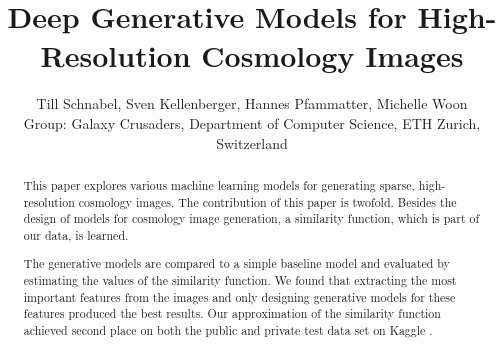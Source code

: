 \documentclass[10pt,conference,compsocconf]{IEEEtran}
\newcommand\TODO[1]{\textcolor{red}{#1}} %
\begin{document}
\title{Deep Generative Models for High-Resolution Cosmology Images}

\author{Till Schnabel, Sven Kellenberger, Hannes Pfammatter, Michelle Woon \\Group: Galaxy Crusaders, Department of Computer Science, ETH Zurich, Switzerland}

\maketitle

\begin{abstract}
This paper explores various machine learning models for generating sparse, high-resolution cosmology images. %
The contribution of this paper is twofold. Besides the design of models for cosmology image generation, a similarity function, which is part of our data, is learned.

The generative models are compared to a simple baseline model and evaluated by estimating the values of the similarity function. We found that extracting the most important features from the images and only designing generative models for these features produced the best results. Our approximation of the similarity function achieved second place on both the public and private test data set on Kaggle \cite{Kaggle}.




\end{abstract}
\end{document}
